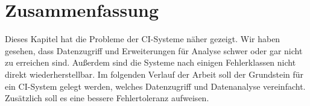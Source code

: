 \section{Zusammenfassung}

Dieses Kapitel hat die Probleme der \ac{CI}-Systeme n\"aher gezeigt.
Wir haben gesehen, dass Datenzugriff und Erweiterungen f\"ur Analyse
schwer oder gar nicht zu erreichen sind.
Außerdem sind die Systeme nach einigen Fehlerklassen nicht direkt wiederherstellbar.
Im folgenden Verlauf der Arbeit soll der Grundstein f\"ur ein \ac{CI}-System gelegt werden,
welches Datenzugriff und Datenanalyse vereinfacht.
Zus\"atzlich soll es eine bessere Fehlertoleranz aufweisen.


